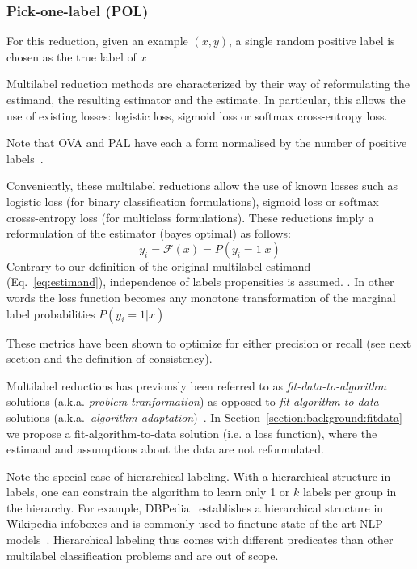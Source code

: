 \subsubsection*{Pick-one-label (POL)}

For this reduction, given an example $(x,y)$, a single random positive label is chosen as the true label of $x$

\vspace{\baselineskip}

Multilabel reduction methods are characterized by their way of reformulating the estimand, the resulting estimator and the estimate. In particular, this allows the use of existing losses: logistic loss, sigmoid loss or softmax cross-entropy loss.

Note that OVA and PAL have each a form normalised by the number of positive labels~\cite{multilabelReduction}.

Conveniently, these multilabel reductions allow the use of known losses such as logistic loss (for binary classification formulations), sigmoid loss or softmax crosss-entropy loss (for multiclass formulations). These reductions imply a reformulation of the estimator (bayes optimal) as follows:
%
\begin{equation}
  y_i = \mathcal{F}(x) = P(y_i = 1 | x)
\end{equation}
%
Contrary to our definition of the original multilabel estimand (Eq.~\ref{eq:estimand}), independence of labels propensities is assumed. . In other words the loss function becomes any monotone transformation of the marginal label probabilities $ P(y_i = 1 | x)$ ~\cite{OVA2, multilabelMetrics, unifiedView}

These  metrics have been shown to optimize for either precision or recall (see next section and the definition of consistency).

Multilabel reductions has previously been referred to as \emph{fit-data-to-algorithm} solutions (a.k.a. \emph{problem tranformation}) as opposed to \emph{fit-algorithm-to-data} solutions (a.k.a.\ \emph{algorithm adaptation})~\cite{multilabelReview, multilabelReview2}. In Section~\ref{section:background:fitdata} we propose a fit-algorithm-to-data solution (i.e. a loss function), where the estimand and assumptions about the data are not reformulated.

 Note the special case of hierarchical labeling. With a hierarchical structure in labels, one can constrain the algorithm to learn only 1 or $k$ labels per group in the hierarchy. For example, DBPedia~\citep{lehmann2015dbpedia} establishes a hierarchical structure in Wikipedia infoboxes and is commonly used to finetune state-of-the-art NLP models~\citep[see, e.g.,][]{XLNet, ULMFit}. Hierarchical labeling thus comes with different predicates than other multilabel classification problems and are out of scope.

